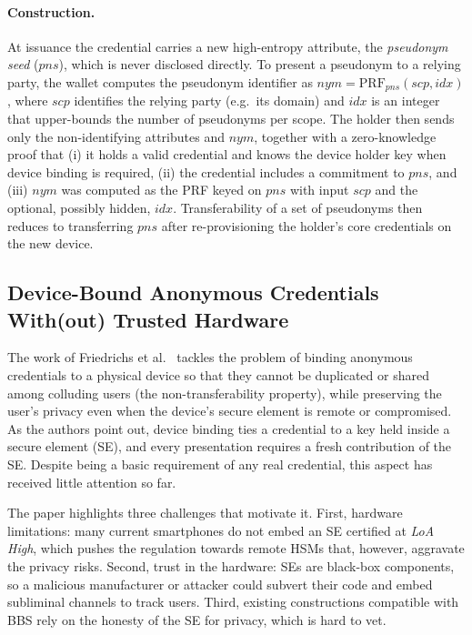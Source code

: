 \documentclass{article}
\begin{document}
\paragraph{Construction.} At issuance the credential carries a new high-entropy attribute, the \emph{pseudonym seed}
($pns$), which is never disclosed directly. To present a pseudonym to a relying party, the wallet computes the
pseudonym identifier as $nym = \mathrm{PRF}_{pns}(scp, idx)$, where $scp$ identifies the relying party (e.g.\ its
domain) and $idx$ is an integer that upper-bounds the number of pseudonyms per scope. The holder then sends only the
non-identifying attributes and $nym$, together with a zero-knowledge proof that (i) it holds a valid credential and
knows the device holder key when device binding is required, (ii) the credential includes a commitment to $pns$, and
(iii) $nym$ was computed as the PRF keyed on $pns$ with input $scp$ and the optional, possibly hidden, $idx$.
Transferability of a set of pseudonyms then reduces to transferring $pns$ after re-provisioning the holder's core
credentials on the new device.

\subsection{Device-Bound Anonymous Credentials With(out) Trusted Hardware}
\label{devboundancred}
The work of Friedrichs et al.~\cite{Friedrichs2025DeviceBound} tackles the problem of binding anonymous credentials
to a physical device so that they cannot be duplicated or shared among colluding users (the non-transferability
property), while preserving the user's privacy even when the device's secure element is remote or compromised. As the
authors point out, device binding ties a credential to a key held inside a secure element (SE), and every presentation
requires a fresh contribution of the SE. Despite being a basic requirement of any real credential, this aspect has
received little attention so far.

The paper highlights three challenges that motivate it. First, hardware limitations: many current smartphones do not
embed an SE certified at \emph{LoA High}, which pushes the regulation towards remote HSMs that, however, aggravate the
privacy risks. Second, trust in the hardware: SEs are black-box components, so a malicious manufacturer or attacker
could subvert their code and embed subliminal channels to track users. Third, existing constructions compatible with
BBS rely on the honesty of the SE for privacy, which is hard to vet.
\end{document}
